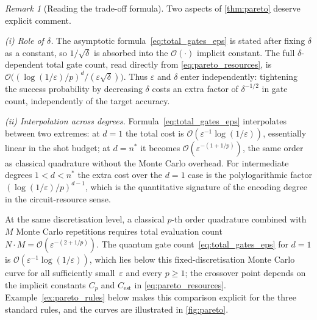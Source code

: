 \documentclass[12pt,a4paper]{article}
\theoremstyle{plain}
\theoremstyle{definition}
\theoremstyle{remark}
\newtheorem{remark}[remark]{Remark}
\begin{document}
\begin{remark}[Reading the trade-off formula]
\label{rem:reading_tradeoff}
Two aspects of \cref{thm:pareto} deserve explicit comment.

\medskip
\noindent\textit{(i) Role of $\delta$.}
The asymptotic formula~\eqref{eq:total_gates_eps} is stated after fixing
$\delta$ as a constant, so $1/\sqrt{\delta}$ is absorbed into the
$\mathcal{O}(\cdot)$ implicit constant.
The full $\delta$-dependent total gate count, read directly from
\eqref{eq:pareto_resources}, is
$\mathcal{O}\bigl((\log(1/\varepsilon)/p)^d/(\varepsilon\sqrt{\delta})\bigr)$.
Thus $\varepsilon$ and $\delta$ enter independently: tightening the
success probability by decreasing $\delta$ costs an extra factor of
$\delta^{-1/2}$ in gate count, independently of the target accuracy.

\medskip
\noindent\textit{(ii) Interpolation across degrees.}
Formula~\eqref{eq:total_gates_eps} interpolates between two extremes:
at $d=1$ the total cost is $\mathcal{O}(\varepsilon^{-1}\log(1/\varepsilon))$,
essentially linear in the shot budget; at $d=n^*$ it becomes
$\mathcal{O}(\varepsilon^{-(1+1/p)})$, the same order as classical
quadrature without the Monte Carlo overhead.
For intermediate degrees $1<d<n^*$ the extra cost over the $d=1$ case
is the polylogarithmic factor $(\log(1/\varepsilon)/p)^{d-1}$, which is
the quantitative signature of the encoding degree in the circuit-resource
sense.
\end{remark}

At the same discretisation level, a classical $p$-th order quadrature
combined with $M$ Monte Carlo repetitions requires total evaluation
count $N\cdot M=\mathcal{O}(\varepsilon^{-(2+1/p)})$.
The quantum gate count~\eqref{eq:total_gates_eps} for $d=1$ is
$\mathcal{O}(\varepsilon^{-1}\log(1/\varepsilon))$, which lies below
this fixed-discretisation Monte Carlo curve for all sufficiently
small~$\varepsilon$ and every $p\geq 1$; the crossover point depends on
the implicit constants $C_p$ and $C_{\mathrm{est}}$ in
\eqref{eq:pareto_resources}.  Example~\ref{ex:pareto_rules} below
makes this comparison explicit for the three standard rules, and the
curves are illustrated in \cref{fig:pareto}.
\end{document}
